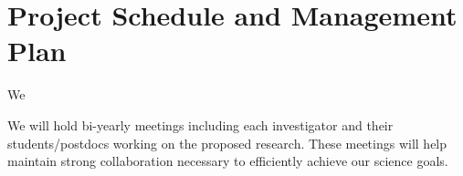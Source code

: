 \section{Project Schedule and Management Plan}

We

We will  hold bi-yearly meetings including each investigator and their students/postdocs working on the proposed research. These meetings will help maintain strong collaboration necessary to efficiently achieve our science goals.
